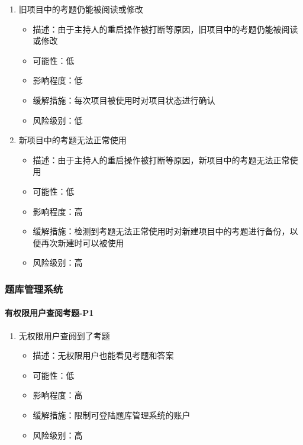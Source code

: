 \documentclass[hyperref, a4paper]{ctexart}
\providecommand{\tightlist}{%
  \setlength{\itemsep}{0pt}\setlength{\parskip}{0pt}}
\let\oldparagraph\paragraph
\renewcommand{\paragraph}[1]{\oldparagraph{#1}\mbox{}}
\begin{document}
\begin{enumerate}
\def\labelenumi{\arabic{enumi}.}
\tightlist
\item
  旧项目中的考题仍能被阅读或修改

  \begin{itemize}
  \tightlist
  \item
    描述：由于主持人的重启操作被打断等原因，旧项目中的考题仍能被阅读或修改
  \item
    可能性：低
  \item
    影响程度：低
  \item
    缓解措施：每次项目被使用时对项目状态进行确认
  \item
    风险级别：低
  \end{itemize}
\item
  新项目中的考题无法正常使用

  \begin{itemize}
  \tightlist
  \item
    描述：由于主持人的重启操作被打断等原因，新项目中的考题无法正常使用
  \item
    可能性：低
  \item
    影响程度：高
  \item
    缓解措施：检测到考题无法正常使用时对新建项目中的考题进行备份，以便再次新建时可以被使用
  \item
    风险级别：高
  \end{itemize}
\end{enumerate}

\hypertarget{ux9898ux5e93ux7ba1ux7406ux7cfbux7edf-1}{%
\subsubsection{题库管理系统}\label{ux9898ux5e93ux7ba1ux7406ux7cfbux7edf-1}}

\hypertarget{ux6709ux6743ux9650ux7528ux6237ux67e5ux9605ux8003ux9898-p1}{%
\paragraph{有权限用户查阅考题-P1}\label{ux6709ux6743ux9650ux7528ux6237ux67e5ux9605ux8003ux9898-p1}}

\begin{enumerate}
\def\labelenumi{\arabic{enumi}.}
\tightlist
\item
  无权限用户查阅到了考题

  \begin{itemize}
  \tightlist
  \item
    描述：无权限用户也能看见考题和答案
  \item
    可能性：低
  \item
    影响程度：高
  \item
    缓解措施：限制可登陆题库管理系统的账户
  \item
    风险级别：高
  \end{itemize}
\end{enumerate}
\end{document}
